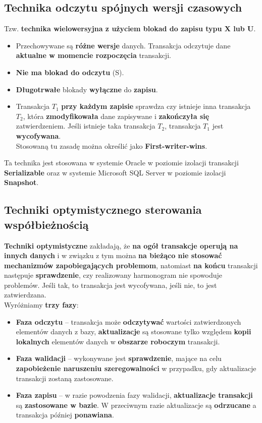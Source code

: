 \documentclass[a4paper]{article}
\begin{document}
\subsection{Technika odczytu spójnych wersji czasowych}
Tzw. \textbf{technika wielowersyjna z użyciem
blokad do zapisu typu X lub U}.\\
\begin{itemize}
    \item Przechowywane są \textbf{różne wersje} danych. Transakcja odczytuje dane \textbf{aktualne w momencie rozpoczęcia} transakcji.
    \item \textbf{Nie ma blokad do odczytu} (S).
    \item \textbf{Długotrwałe} blokady \textbf{wyłączne} do \textbf{zapisu}.
    \item Transakcja $T_1$ \textbf{przy każdym zapisie} sprawdza czy istnieje inna transakcja $T_2$, która \textbf{zmodyfikowała} dane zapisywane i \textbf{zakończyła się} zatwierdzeniem. Jeśli istnieje taka transakcja $T_2$, transakcja $T_1$ jest \textbf{wycofywana}.\\ Stosowaną tu zasadę można określić jako \textbf{First-writer-wins}.
\end{itemize}
Ta technika jest stosowana w systemie Oracle w poziomie izolacji transakcji \textbf{Serializable} oraz w systemie Microsoft SQL Server w poziomie izolacji \textbf{Snapshot}. 

\subsection{Techniki optymistycznego sterowania współbieżnością}
\textbf{Techniki optymistyczne} zakładają, że \textbf{na ogół transakcje operują na innych danych} i w związku z tym można \textbf{na bieżąco nie stosować mechanizmów zapobiegających problemom}, natomiast \textbf{na końcu} transakcji następuje \textbf{sprawdzenie}, czy realizowany harmonogram nie
spowoduje problemów. Jeśli tak, to transakcja jest wycofywana, jeśli nie, to jest zatwierdzana.\\
Wyróżniamy \textbf{trzy fazy}:
\begin{itemize}
    \item \textbf{Faza odczytu} – transakcja może \textbf{odczytywać} wartości zatwierdzonych elementów danych z bazy, \textbf{aktualizacje} są stosowane tylko względem \textbf{kopii lokalnych} elementów danych w \textbf{obszarze roboczym} transakcji.
    \item  \textbf{Faza walidacji} – wykonywane jest \textbf{sprawdzenie}, mające na celu \textbf{zapobieżenie naruszeniu szeregowalności} w przypadku, gdy aktualizacje transakcji zostaną zastosowane.
    \item  \textbf{Faza zapisu} – w razie powodzenia fazy walidacji, \textbf{aktualizacje transakcji} są \textbf{zastosowane w bazie}. W przeciwnym razie aktualizacje są \textbf{odrzucane} a transakcja później \textbf{ponawiana}. 
\end{itemize}
\end{document}
